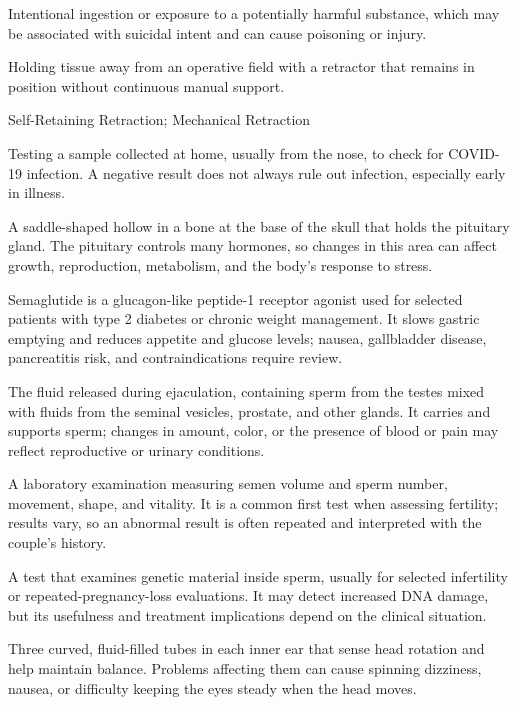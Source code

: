  Intentional ingestion or exposure to a potentially harmful substance, which may be associated with suicidal intent and can cause poisoning or injury.

 Holding tissue away from an operative field with a retractor that remains in position without
continuous manual support.

\synonyms
Self-Retaining Retraction; Mechanical Retraction

 Testing a sample collected at home, usually from the nose, to check for COVID-19 infection. A negative result does not always rule out infection, especially early in illness.

 A saddle-shaped hollow in a bone at the base of the skull that holds the pituitary gland. The pituitary controls many hormones, so changes in this area can affect growth, reproduction, metabolism, and the body's response to stress.

 Semaglutide is a glucagon-like peptide-1 receptor agonist used for selected patients with type 2 diabetes or chronic weight management. It slows gastric emptying and reduces appetite and glucose levels; nausea, gallbladder disease, pancreatitis risk, and contraindications require review.

 The fluid released during ejaculation, containing sperm from the testes mixed with fluids from the seminal vesicles, prostate, and other glands. It carries and supports sperm; changes in amount, color, or the presence of blood or pain may reflect reproductive or urinary conditions.

 A laboratory examination measuring semen volume and sperm number, movement, shape, and vitality. It is a common first test when assessing fertility; results vary, so an abnormal result is often repeated and interpreted with the couple’s history.

 A test that examines genetic material inside sperm, usually for selected infertility or repeated-pregnancy-loss evaluations. It may detect increased DNA damage, but its usefulness and treatment implications depend on the clinical situation.

 Three curved, fluid-filled tubes in each inner ear that sense head rotation and help maintain balance. Problems affecting them can cause spinning dizziness, nausea, or difficulty keeping the eyes steady when the head moves.

